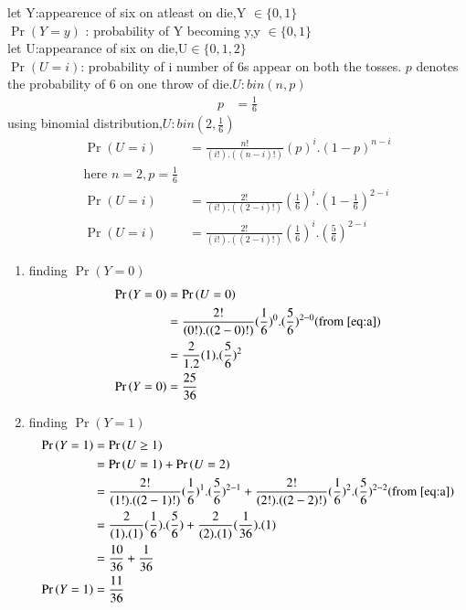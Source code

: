 \documentclass[journal,12pt,onecolumn]{IEEEtran}
\providecommand{\pr}[1]{\ensuremath{\Pr\left(#1\right)}}
\theoremstyle{remark}
\begin{document}
\begin{enumerate}
let Y:appearence of six on atleast on die,Y $\in \{ 0,1\}$ \\
$\pr{Y=y}$ : probability of Y becoming y,y $\in \{ 0,1\}$\\
let U:appearance of six on die,U$\in \{0,1,2\}$\\
$\pr{U=i}$: probability of i number of 6s appear on both the tosses.
$p$ denotes the probability of 6 on one throw of die.$U:bin(n,p)$
\begin{align}
 p&=\frac{1}{6} 
\end{align}
using binomial distribution,$U:bin(2,\frac{1}{6})$
\begin{align}
\pr{U=i}&=\frac{n!}{(i!).((n-i)!)}(p)^i.(1-p)^{n-i}\\
\text{here } n=2,p=\frac{1}{6} \\
\pr{U=i}&=\frac{2!}{(i!).((2-i)!)}(\frac{1}{6})^i.(1-\frac{1}{6})^{2-i}\\
\pr{U=i}&=\frac{2!}{(i!).((2-i)!)}(\frac{1}{6})^i.(\frac{5}{6})^{2-i} \label{eq:a}
\end{align} 
\begin{enumerate}
\item finding $\pr{Y=0}$
\begin{align}
\pr{Y=0}&=\pr{U=0}\\
&=\frac{2!}{(0!).((2-0)!)}(\frac{1}{6})^0.(\frac{5}{6})^{2-0} (\text{from } \eqref{eq:a})\\
&=\frac{2}{1.2}(1).(\frac{5}{6})^{2}\\
\pr{Y=0}&=\frac{25}{36}
\end{align}
\item finding $\pr{Y=1}$
\begin{align}
\pr{Y=1}&=\pr{U\geq1}\\
&=\pr{U=1}+\pr{U=2}\\
&=\frac{2!}{(1!).((2-1)!)}(\frac{1}{6})^1.(\frac{5}{6})^{2-1}+\frac{2!}{(2!).((2-2)!)}(\frac{1}{6})^2.(\frac{5}{6})^{2-2} (\text{from }\eqref{eq:a})\\
&=\frac{2}{(1).(1)}(\frac{1}{6}).(\frac{5}{6})+\frac{2}{(2).(1)}(\frac{1}{36}).(1)  \\
&=\frac{10}{36}+\frac{1}{36}\\
\pr{Y=1}&=\frac{11}{36}
\end{align}
\end{enumerate}
\end{enumerate}
\end{document}
